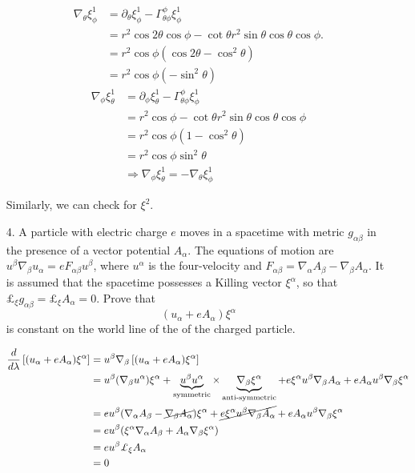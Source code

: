 \documentclass[fleqn]{article}
\begin{document}
\begin{enumerate}
  \begin{align*}
    \nabla_\theta\xi^1_\phi
    & = \partial_\theta\xi^1_\phi - \Gamma^\phi_{\theta\phi}\xi^1_\phi\\
    & = r^2\cos 2\theta\cos\phi - \cot\theta r^2\sin\theta\cos\theta\cos\phi.\\
    & = r^2\cos\phi(\cos2\theta - \cos^2\theta)\\
    & = r^2\cos\phi(-\sin^2\theta)
  \end{align*}
  \begin{align*}
    \nabla_\phi\xi^1_\theta
    & = \partial_\phi\xi^1_\theta - \Gamma_{\theta\phi}^\phi\xi^1_\phi\\
    & = r^2\cos\phi - \cot\theta r^2\sin\theta\cos\theta\cos\phi\\
    & = r^2\cos\phi(1 - \cos^2\theta)\\
    & = r^2\cos\phi\sin^2\theta\\
    & \Rightarrow\boxed{\nabla_\phi\xi^1_\theta = - \nabla_\theta\xi^1_\phi}
  \end{align*}

  Similarly, we can check for $\xi^2$.
  
\item[4.] A particle with electric charge $e$ moves in a spacetime with metric $g_{\alpha\beta}$ in the presence of a vector potential $A_\alpha$. The equations of motion are $u^\beta \nabla_\beta u_\alpha = e F_{\alpha\beta}u^\beta$, where $u^\alpha$ is the four-velocity and $F_{\alpha\beta}=\nabla_\alpha A_\beta - \nabla_\beta A_\alpha$. It is assumed that the spacetime possesses a Killing vector $\xi^\alpha$, so that $\pounds_\xi g_{\alpha\beta} = \pounds_\xi A_\alpha = 0$. Prove that
  \begin{equation}
    \label{eq:conserved-quantity-em-field}
    (u_\alpha + e A_\alpha)\xi^\alpha
  \end{equation}
  is constant on the world line of the of the charged particle.

  \begin{align*}
    \frac{d}{d\lambda}\left[(u_\alpha + e A_\alpha)\xi^\alpha\right]
    & = u^\beta\nabla_\beta\left[(u_\alpha + e A_\alpha)\xi^\alpha\right]\\
    & = u^\beta(\nabla_\beta u^\alpha)\xi^\alpha + \underbrace{u^\beta u^\alpha}_{\text{symmetric}}\times \underbrace{\nabla_\beta \xi^\alpha}_{\text{anti-symmetric}} + e \xi^\alpha u^\beta\nabla_\beta A_\alpha + e A_\alpha u^\beta \nabla_\beta \xi^\alpha\\
    & = eu^\beta(\nabla_\alpha A_\beta - \cancel{\nabla_\beta A_\alpha})\xi^\alpha + \cancel{e\xi^\alpha u^\beta \nabla_\beta A_\alpha} + e A_\alpha u^\beta \nabla_\beta \xi^\alpha\\
    & = e u^\beta (\xi^\alpha\nabla_\alpha A_\beta + A_\alpha \nabla_\beta \xi^\alpha)\\
    & = e u^\beta \pounds_\xi A_\alpha\\
    & = 0
  \end{align*}


\end{enumerate}
\end{document}
